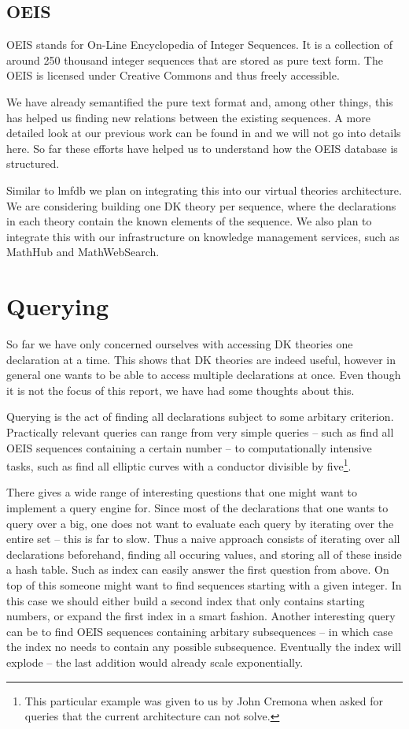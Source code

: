 \documentclass{deliverablereport}
\begin{document}
\subsection{OEIS}

OEIS \cite{oeis} stands for On-Line Encyclopedia of Integer Sequences. It is a collection of around 250 thousand integer sequences that are stored as pure text form. The OEIS is licensed under Creative Commons and thus freely accessible.

We have already semantified the pure text format and, among other things, this has helped us finding new relations between the existing sequences. A more detailed look at our previous work can be found in \cite{LuzKoh:fsarfo16} and we will not go into details here. So far these efforts have helped us to understand how the OEIS database is structured.

Similar to lmfdb we plan on integrating this into our virtual theories architecture. We are considering building one DK theory per sequence, where the declarations in each theory contain the known elements of the sequence. We also plan to integrate this with our infrastructure on knowledge management services, such as MathHub and MathWebSearch.

\section{Querying}\label{sec:querying}

So far we have only concerned ourselves with accessing DK theories one declaration at a time. This shows that DK theories are indeed useful, however in general one wants to be able to access multiple declarations at once. Even though it is not the focus of this report, we have had some thoughts about this.

Querying is the act of finding all declarations subject to some arbitary criterion. Practically relevant queries can range from very simple queries -- such as find all OEIS sequences containing a certain number -- to computationally intensive tasks, such as find all elliptic curves with a conductor divisible by five\footnote{This particular example was given to us by John Cremona when asked for queries that the current architecture can not solve. }.

There gives a wide range of interesting questions that one might want to implement a query engine for. Since most of the declarations that one wants to query over a big, one does not want to evaluate each query by iterating over the entire set -- this is far to slow. Thus a naive approach consists of iterating over all declarations beforehand, finding all occuring values, and storing all of these inside a hash table. Such as index can easily answer the first question from above. On top of this someone might want to find sequences starting with a given integer. In this case we should either build a second index that only contains starting numbers, or expand the first index in a smart fashion. Another interesting query can be to find OEIS sequences containing arbitary subsequences -- in which case the index no needs to contain any possible subsequence. Eventually the index will explode -- the last addition would already scale exponentially.
\end{document}
